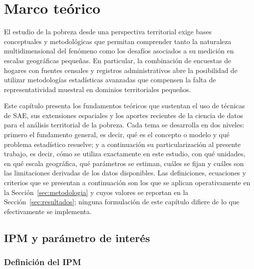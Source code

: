 \label{sec:Marco-referencia}


\section{Marco teórico}
\label{sec:Marco-teorico}
    El estudio de la pobreza desde una perspectiva territorial exige bases conceptuales y metodológicas que permitan comprender tanto la naturaleza multidimensional del fenómeno como los desafíos asociados a su medición en escalas geográficas pequeñas. En particular, la combinación de encuestas de hogares con fuentes censales y registros administrativos abre la posibilidad de utilizar metodologías estadísticas avanzadas que compensen la falta de representatividad muestral en dominios territoriales pequeños.

    Este capítulo presenta los fundamentos teóricos que sustentan el uso de técnicas de SAE, sus extensiones espaciales y los aportes recientes de la ciencia de datos para el análisis territorial de la pobreza. Cada tema se desarrolla en dos niveles: primero el fundamento general, es decir, qué es el concepto o modelo y qué problema estadístico resuelve; y a continuación su particularización al presente trabajo, es decir, cómo se utiliza exactamente en este estudio, con qué unidades, en qué escala geográfica, qué parámetros se estiman, cuáles se fijan y cuáles son las limitaciones derivadas de los datos disponibles. Las definiciones, ecuaciones y criterios que se presentan a continuación son los que se aplican operativamente en la Sección~\ref{sec:metodologia} y cuyos valores se reportan en la Sección~\ref{sec:resultados}; ninguna formulación de este capítulo difiere de lo que efectivamente se implementa.

\subsection{IPM y parámetro de interés}

\subsubsection{Definición del IPM}
\label{subsec:def_IPM}

